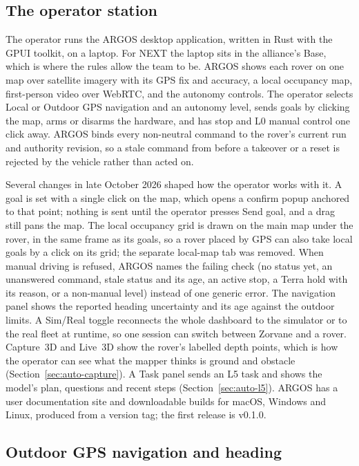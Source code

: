 \subsection{The operator station}
\label{sec:env-argos}

The operator runs the ARGOS desktop application, written in Rust with the GPUI toolkit, on a laptop.
For NEXT the laptop sits in the alliance's Base, which is where the rules allow the team to be.
ARGOS shows each rover on one map over satellite imagery with its GPS fix and accuracy, a local occupancy map, first-person video over WebRTC, and the autonomy controls.
The operator selects Local or Outdoor GPS navigation and an autonomy level, sends goals by clicking the map, arms or disarms the hardware, and has stop and L0 manual control one click away.
ARGOS binds every non-neutral command to the rover's current run and authority revision, so a stale command from before a takeover or a reset is rejected by the vehicle rather than acted on.

Several changes in late October 2026 shaped how the operator works with it.
A goal is set with a single click on the map, which opens a confirm popup anchored to that point; nothing is sent until the operator presses Send goal, and a drag still pans the map.
The local occupancy grid is drawn on the main map under the rover, in the same frame as its goals, so a rover placed by GPS can also take local goals by a click on its grid; the separate local-map tab was removed.
When manual driving is refused, ARGOS names the failing check (no status yet, an unanswered command, stale status and its age, an active stop, a Terra hold with its reason, or a non-manual level) instead of one generic error.
The navigation panel shows the reported heading uncertainty and its age against the outdoor limits.
A Sim/Real toggle reconnects the whole dashboard to the simulator or to the real fleet at runtime, so one session can switch between Zorvane and a rover.
Capture~3D and Live~3D show the rover's labelled depth points, which is how the operator can see what the mapper thinks is ground and obstacle (Section~\ref{sec:auto-capture}).
A Task panel sends an L5 task and shows the model's plan, questions and recent steps (Section~\ref{sec:auto-l5}).
ARGOS has a user documentation site and downloadable builds for macOS, Windows and Linux, produced from a version tag; the first release is v0.1.0.

\subsection{Outdoor GPS navigation and heading}
\label{sec:env-gps}


